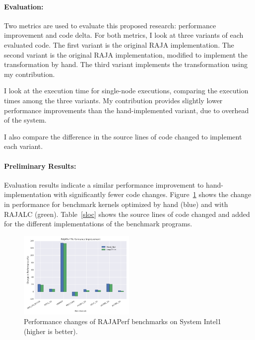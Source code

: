\documentclass{article}
\begin{document}
\paragraph{Evaluation:}

Two metrics are used to evaluate this proposed research: performance improvement and code delta. 
For both metrics, I look at three variants of each evaluated code.
The first variant is the original RAJA implementation. 
The second variant is the original RAJA implementation, modified to implement the transformation by hand.
The third variant implements the transformation using my contribution.

I look at the execution time for single-node executions, comparing the execution times among the three variants. My contribution provides slightly lower performance improvements than the hand-implemented variant, due to overhead of the system.

I also compare the difference in the source lines of code changed to implement each variant.

\paragraph{Preliminary Results:}
Evaluation results indicate a similar performance improvement to hand-implementation with significantly fewer code changes.
Figure~\ref{RAJAPerfPerf} shows the change in performance for benchmark kernels optimized by hand (blue) and with RAJALC (green). 
Table~\ref{sloc} shows the source lines of code changed and added for the different implementations of the benchmark programs.

\begin{figure}
\includegraphics[width=0.5\textwidth]{RAJALC-perf-system-1.png}
\caption{Performance changes of RAJAPerf benchmarks on System Intel1 (higher is better).}
\label{RAJAPerfPerf}
\end{figure}
\end{document}
